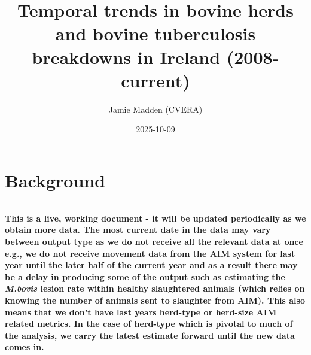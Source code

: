 \documentclass[
  letterpaper,
  DIV=11,
  numbers=noendperiod]{scrreprt}
\title{Temporal trends in bovine herds and bovine tuberculosis
breakdowns in Ireland (2008-current)}
\author{Jamie Madden (CVERA)}
\date{2025-10-09}
\renewcommand*\contentsname{Table of contents}
\newcommand\contentsname{Table of contents}
\begin{document}
\maketitle

\renewcommand*\contentsname{Table of contents}
{
\hypersetup{linkcolor=}
\setcounter{tocdepth}{2}
\tableofcontents
}


\chapter*{Background}\label{background}


\begin{center}\rule{0.5\linewidth}{0.5pt}\end{center}

\begin{tcolorbox}[enhanced jigsaw, colbacktitle=quarto-callout-warning-color!10!white, opacitybacktitle=0.6, colback=white, breakable, coltitle=black, colframe=quarto-callout-warning-color-frame, arc=.35mm, leftrule=.75mm, rightrule=.15mm, toprule=.15mm, bottomtitle=1mm, toptitle=1mm, opacityback=0, title=\textcolor{quarto-callout-warning-color}{\faExclamationTriangle}\hspace{0.5em}{Note}, bottomrule=.15mm, left=2mm, titlerule=0mm]

\textbf{This is a live, working document - it will be updated
periodically as we obtain more data. The most current date in the data
may vary between output type as we do not receive all the relevant data
at once e.g., we do not receive movement data from the AIM system for
last year until the later half of the current year and as a result there
may be a delay in producing some of the output such as estimating the
\emph{M.bovis} lesion rate within healthy slaughtered animals (which
relies on knowing the number of animals sent to slaughter from AIM).
This also means that we don't have last years herd-type or herd-size AIM
related metrics. In the case of herd-type which is pivotal to much of
the analysis, we carry the latest estimate forward until the new data
comes in.}

\end{tcolorbox}
\end{document}
